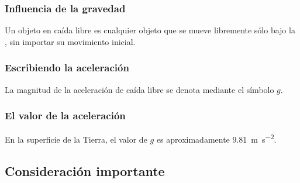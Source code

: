 \documentclass[14pt]{beamer}
\begin{document}
\begin{frame}
\frametitle{Influencia de la gravedad}
Un objeto en caída libre es cualquier objeto que se mueve libremente sólo bajo la , \pause sin importar su movimiento inicial.
\end{frame}
\begin{frame}
\frametitle{Escribiendo la aceleración}
La magnitud de la aceleración de caída libre se denota mediante el símbolo $g$.
\end{frame}
\begin{frame}
\frametitle{El valor de la aceleración}
En la superficie de la Tierra, el valor de $g$ es aproximadamente \SI{9.81}{\meter\per\square\second}.
\end{frame}

\subsection{Consideración importante}
\end{document}
